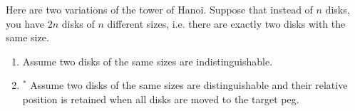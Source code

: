 Here are two variations of the tower of Hanoi.
Suppose that instead of $n$ disks, you have $2n$ disks
of $n$ different sizes, i.e. 
there are exactly two disks with the same size.
\begin{enumerate}[nosep]
\item Assume two disks of the same sizes are indistinguishable.
\item$^*$ Assume two disks of the same sizes are distinguishable
and their relative position is retained when all disks are moved to the
target peg.
\end{enumerate}
